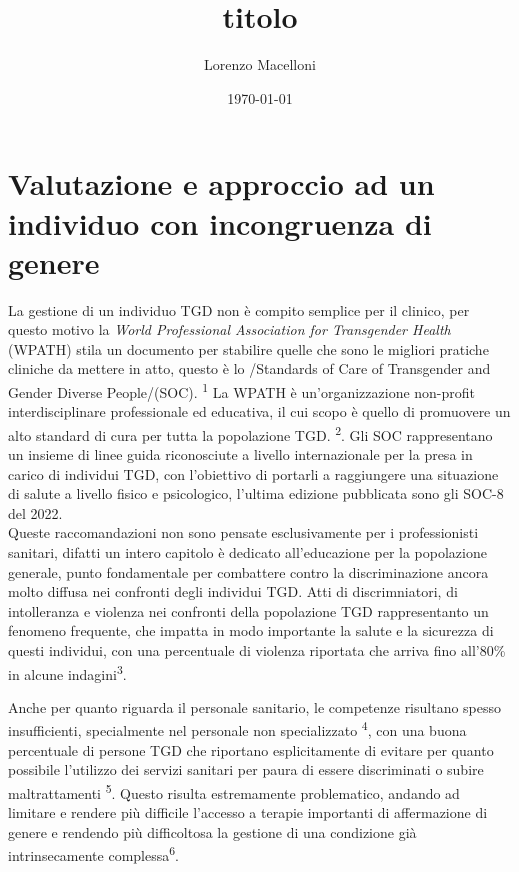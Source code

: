 \documentclass[11pt]{article}
\author{Lorenzo Macelloni}
\date{\today}
\title{titolo}
\begin{document}
\maketitle
\tableofcontents

\section{Valutazione e approccio ad un individuo con incongruenza di genere}
\label{sec:orgadee669}

La gestione di un individuo TGD non è compito semplice per il clinico, per questo motivo la \emph{World Professional Association for Transgender Health} (WPATH) stila un documento per stabilire quelle che sono le migliori pratiche cliniche da mettere in atto, questo è lo /Standards of Care of Transgender and Gender Diverse People/(SOC). \textsuperscript{1}
La WPATH è un'organizzazione non-profit interdisciplinare professionale ed educativa, il cui scopo è quello di promuovere un alto standard di cura per tutta la popolazione TGD. \textsuperscript{2}.
Gli SOC rappresentano un insieme di linee guida riconosciute a livello internazionale per la presa in carico di individui TGD, con l'obiettivo di portarli a raggiungere una situazione di salute a livello fisico e psicologico, l'ultima edizione pubblicata sono gli SOC-8 del 2022. \\

Queste raccomandazioni non sono pensate esclusivamente per i professionisti sanitari, difatti un intero capitolo è dedicato all'educazione per la popolazione generale, punto fondamentale per combattere contro la discriminazione ancora molto diffusa nei confronti degli individui TGD.
Atti di discrimniatori, di intolleranza e violenza nei confronti della popolazione TGD rappresentanto un fenomeno frequente, che impatta in modo importante la salute e la sicurezza di questi individui, con una percentuale di violenza riportata che arriva fino all'80\% in alcune indagini\textsuperscript{3}.

Anche per quanto riguarda il personale sanitario, le competenze risultano spesso insufficienti, specialmente nel personale non specializzato \textsuperscript{4}, con una buona percentuale di persone TGD che riportano esplicitamente di evitare per quanto possibile l'utilizzo dei servizi sanitari per paura di essere discriminati o subire maltrattamenti \textsuperscript{5}. Questo risulta estremamente problematico, andando ad limitare e rendere più difficile l'accesso a terapie importanti di affermazione di genere e rendendo più difficoltosa la gestione di una condizione già intrinsecamente complessa\textsuperscript{6}.
\end{document}
